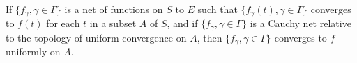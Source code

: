 If $\{f_{\gamma}, \gamma \in \Gamma\}$ is a net of functions on $S$ to $E$ such that $\{f_{\gamma}(t), \gamma \in \Gamma\}$ converges to $f(t)$ for each $t$ in a subset $A$ of $S$, and if $\{f_{\gamma}, \gamma \in \Gamma\}$ is a Cauchy net relative to the topology of uniform convergence on $A$, then $\{f_{\gamma}, \gamma \in \Gamma\}$ converges to $f$ uniformly on $A$.
